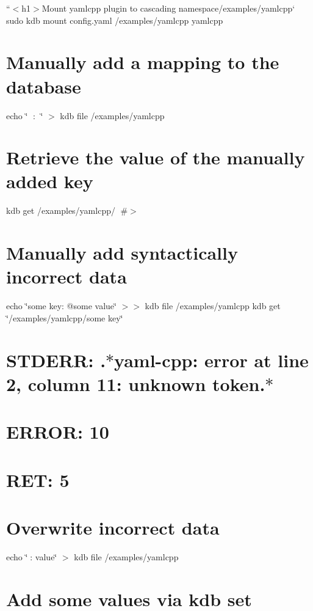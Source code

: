 ``{\ttfamily  $<$h1$>$Mount yamlcpp plugin to cascading namespace}/examples/yamlcpp` sudo kdb mount config.\+yaml /examples/yamlcpp yamlcpp

\section*{Manually add a mapping to the database}

echo \char`\"{}🔑 \+: 🐳\char`\"{} $>$ {\ttfamily kdb file /examples/yamlcpp} \section*{Retrieve the value of the manually added key}

kdb get /examples/yamlcpp/🔑 \#$>$ 🐳

\section*{Manually add syntactically incorrect data}

echo \char`\"{}some key\+: @some  value\char`\"{} $>$$>$ {\ttfamily kdb file /examples/yamlcpp} kdb get \char`\"{}/examples/yamlcpp/some key\char`\"{} \section*{S\+T\+D\+E\+RR\+: .$\ast$yaml-\/cpp\+: error at line 2, column 11\+: unknown token.$\ast$}

\section*{E\+R\+R\+OR\+: 10}

\section*{R\+ET\+: 5}

\section*{Overwrite incorrect data}

echo \char`\"{}🔑\+: value\char`\"{} $>$ {\ttfamily kdb file /examples/yamlcpp}

\section*{Add some values via {\ttfamily kdb set}}

